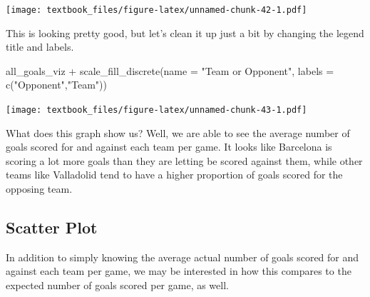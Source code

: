 \documentclass[
  11pt,
]{book}
\newenvironment{Shaded}{\begin{snugshade}}{\end{snugshade}}
\newcommand{\AttributeTok}[1]{\textcolor[rgb]{0.77,0.63,0.00}{#1}}
\newcommand{\FunctionTok}[1]{\textcolor[rgb]{0.00,0.00,0.00}{#1}}
\newcommand{\NormalTok}[1]{#1}
\newcommand{\SpecialCharTok}[1]{\textcolor[rgb]{0.00,0.00,0.00}{#1}}
\newcommand{\StringTok}[1]{\textcolor[rgb]{0.31,0.60,0.02}{#1}}
\theoremstyle{definition}
\theoremstyle{definition}
\theoremstyle{definition}
\theoremstyle{definition}
\theoremstyle{remark}
\begin{document}
\texttt{[image: textbook\_files/figure-latex/unnamed-chunk-42-1.pdf]}

\newpage

This is looking pretty good, but let's clean it up just a bit by changing the legend title and labels.

\begin{Shaded}
\begin{Highlighting}[]
\NormalTok{all\_goals\_viz }\SpecialCharTok{+}
  \FunctionTok{scale\_fill\_discrete}\NormalTok{(}\AttributeTok{name =} \StringTok{"Team or Opponent"}\NormalTok{, }\AttributeTok{labels =} \FunctionTok{c}\NormalTok{(}\StringTok{"Opponent"}\NormalTok{,}\StringTok{"Team"}\NormalTok{))}
\end{Highlighting}
\end{Shaded}

\texttt{[image: textbook\_files/figure-latex/unnamed-chunk-43-1.pdf]}

What does this graph show us? Well, we are able to see the average number of goals scored for and against each team per game. It looks like Barcelona is scoring a lot more goals than they are letting be scored against them, while other teams like Valladolid tend to have a higher proportion of goals scored for the opposing team.

\newpage

\hypertarget{scatter-plot-1}{%
\subsection{Scatter Plot}\label{scatter-plot-1}}

In addition to simply knowing the average actual number of goals scored for and against each team per game, we may be interested in how this compares to the expected number of goals scored per game, as well.
\end{document}
